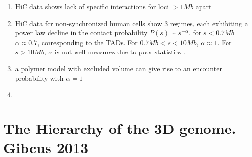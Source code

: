 \documentclass[12pt]{book}
\begin{document}
\begin{enumerate}
\item HiC data shows lack of specific interactions for loci $>1Mb$ apart
\item HiC data for non-synchronized human cells show 3 regimes, each exhibiting a power law decline in the contact probability $P(s)\sim s^{-\alpha}$. for $s<0.7Mb$ $\alpha\approx0.7$, corresponding to the TADs. For $0.7Mb<s<10Mb$, $\alpha\approx1$. For $s>10Mb$, $\alpha$ is not well measures due to poor statistics \cite{lieberman2009comprehensive}.
\item a polymer model with excluded volume can give rise to an encounter probability with $\alpha=1$
\item 
\end{enumerate}

\section{The Hierarchy of the 3D genome.  Gibcus 2013 \cite{gibcus2013hierarchy}}
\end{document}
